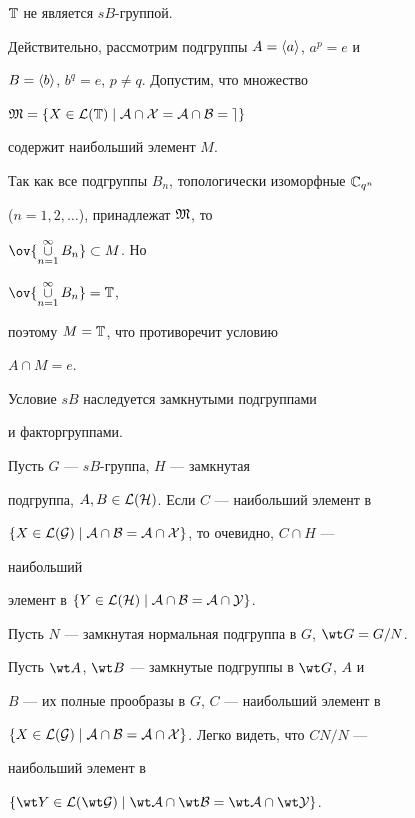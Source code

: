 \begin{exam} 


$\Bbb T$ не является $sB$-группой. 


\end{exam} 


 


Действительно, рассмотрим подгруппы $A=\langle a\rangle$, $a^p=e$ и 


$B=\langle b\rangle$, $b^q=e$, $p\ne q$. Допустим, что множество 


$\frak M=\{X\in\cal L(\Bbb T)\mid A\cap X=A\cap B=e\}$ 


содержит наибольший элемент $M$. 


Так как все подгруппы $B_n$, топологически изоморфные $\Bbb C_{q^n}$ 


($n=1,2,\dotsc$), принадлежат $\frak M$, то 


$\ov{\mathop{\cup}\limits_{n=1}^\infty B_n}\subset M$. Но 


$\ov{\mathop{\cup}\limits_{n=1}^\infty B_n}=\Bbb T$, 


поэтому $M=\Bbb T$, что противоречит условию  


$A\cap M=e$. 


 


\begin{lem} 


Условие $sB$ наследуется замкнутыми подгруппами  


и факторгруппами. 


\end{lem} 


 


\begin{pf} 


Пусть $G$ --- $sB$-группа, $H$ --- замкнутая 


подгруппа, $A,B\in\cal L(H)$. Если $C$ --- наибольший элемент в  


$\{X\in\cal L(G)\mid A\cap B=A\cap X\}$, то очевидно, $C\cap H$ --- 


наибольший 


элемент в $\{Y\in\cal L(H)\mid A\cap B=A\cap Y\}$. 


 


Пусть $N$ --- замкнутая нормальная подгруппа в $G$, $\wt G=G/N$. 


Пусть $\wt A$, $\wt B$ --- замкнутые подгруппы в $\wt G$, $A$ и  


$B$ --- их полные прообразы в $G$, $C$ --- наибольший элемент в  


$\{X\in\cal L(G)\mid A\cap B=A\cap X\}$. Легко видеть, что $CN/N$ --- 


наибольший элемент в 


$\{\wt Y\in\cal L(\wt G)\mid\wt A\cap \wt B=\wt A\cap \wt Y\}$. 


\end{pf} 


